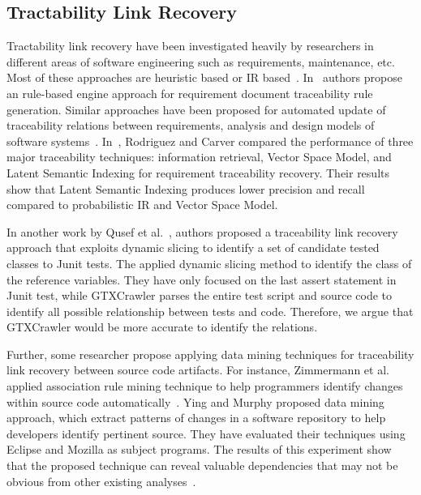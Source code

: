 
\subsection{Tractability Link Recovery}

Tractability link recovery have been investigated heavily 
by researchers in different areas of software engineering 
such as requirements, maintenance, etc.  
Most of these approaches are heuristic based or IR based~\cite{qusef13}. 
In~\cite{spanoudakis04} authors propose an rule-based 
engine approach for requirement document traceability rule 
generation. Similar approaches have been proposed for
automated update of traceability relations
between requirements, analysis and design models of software 
systems~\cite{mader11, bavota13}. 
In~\cite{Rodriguez19}, Rodriguez and Carver compared 
the performance of three major traceability techniques: information retrieval,
Vector Space Model, and Latent Semantic Indexing
for requirement traceability recovery. Their results show 
that Latent Semantic Indexing produces lower precision 
and recall compared to probabilistic IR and Vector Space Model. 


In another work by Qusef et al.~\cite{qusef13}, 
authors proposed a traceability link recovery approach 
that exploits dynamic slicing to identify a set of 
candidate tested classes to Junit tests.
The applied dynamic slicing method to identify 
the class of the reference variables. 
They have only focused on the last assert
statement in Junit test, while GTXCrawler parses the 
entire test script and source code to 
identify all possible relationship between tests 
and code. Therefore, we argue that GTXCrawler would be 
more accurate to identify the relations. 

Further, some researcher propose applying data mining techniques 
for traceability link recovery between source code artifacts. 
For instance, Zimmermann et al. applied association rule mining technique 
to help programmers identify changes within source code
automatically~\cite{Zimmermann04}.  
Ying and Murphy proposed data mining approach, 
which extract patterns of changes in a software repository
to help developers identify pertinent source. 
They have evaluated their techniques using 
Eclipse and Mozilla as subject programs. The 
results of this experiment show that the proposed technique
can reveal valuable dependencies
that may not be obvious from other existing analyses~\cite{Ying04}.








